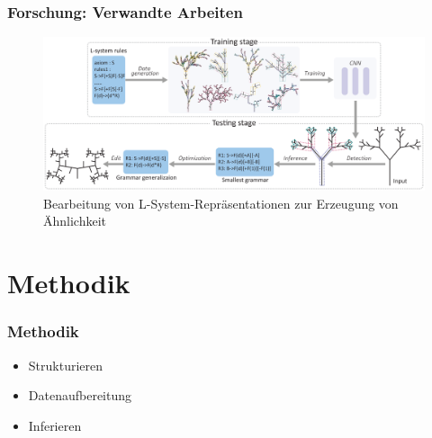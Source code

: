 \documentclass[12pt]{beamer}
\begin{document}
    \begin{frame}
        \frametitle{Forschung: Verwandte Arbeiten}

        \begin{figure}
            \centering
            \includegraphics[width=12cm]{../images/guo_2020_system.PNG}
            \caption{Bearbeitung von L-System-Repräsentationen zur Erzeugung von Ähnlichkeit}
        \end{figure}
    \end{frame}

    \section{Methodik}
    \label{sec:methodik}
    \begin{frame}
        \frametitle{Methodik}

        \begin{itemize}
            \setlength\itemsep{1em}
            \item<1-> Strukturieren
            \item<2-> Datenaufbereitung
            \item<3-> Inferieren
        \end{itemize}
    \end{frame}
\end{document}

